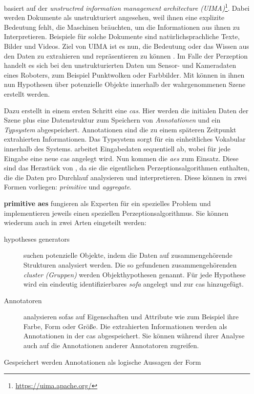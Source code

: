 \robosherlock basiert auf der \textit{unstructred information management architecture (UIMA)}\footnote{\url{https://uima.apache.org/}}. Dabei werden Dokumente als unstrukturiert angesehen, weil ihnen eine explizite Bedeutung fehlt, die Maschinen bräuchten, um die Informationen aus ihnen zu Interpretieren. Beispiele für solche Dokumente sind natürlichsprachliche Texte, Bilder und Videos. Ziel von UIMA ist es nun, die Bedeutung oder das Wissen aus den Daten zu extrahieren und repräsentieren zu können \cite{UIMA}. Im Falle der Perzeption handelt es sich bei den unstrukturierten Daten um Sensor- und Kameradaten eines Roboters, zum Beispiel Punktwolken oder Farbbilder. Mit \robosherlock können in ihnen nun Hypothesen über potenzielle Objekte innerhalb der wahrgenommenen Szene erstellt werden. \par
Dazu erstellt \robosherlock in einem ersten Schritt eine \textit{\gls{cas}}. Hier werden die initialen Daten der Szene plus eine Datenstruktur zum Speichern von \textit{Annotationen} und ein \textit{Typsystem} abgespeichert. Annotationen sind die zu einem späteren Zeitpunkt extrahierten Informationen. Das Typsystem sorgt für ein einheitliches Vokabular innerhalb des Systems. \robosherlock arbeitet Eingabedaten sequentiell ab, wobei für jede Eingabe eine neue \gls{cas} angelegt wird. \newline
Nun kommen die \textit{\glspl{ae}} zum Einsatz. Diese sind das Herzstück von \robosherlock, da sie die eigentlichen Perzeptionsalgorithmen enthalten, die die Daten pro Durchlauf analysieren und interpretieren. Diese können in zwei Formen vorliegen: \textit{primitive} und \textit{aggregate}. \par
\textbf{primitive \glspl{ae}} fungieren als Experten für ein spezielles Problem und implementieren jeweils einen speziellen Perzeptionsalgorithmus. Sie können wiederum auch in zwei Arten eingeteilt werden:
\begin{description}
\item[hypotheses generators] suchen potenzielle Objekte, indem die Daten auf zusammengehörende Strukturen analysiert werden. Die so gefundenen zusammengehörenden \textit{cluster (Gruppen)} werden Objekthypothesen genannt. Für jede Hypothese wird ein eindeutig identifizierbares \textit{\gls{sofa}} angelegt und zur \gls{cas} hinzugefügt.
\item[Annotatoren] analysieren \glspl{sofa} auf Eigenschaften und Attribute wie zum Beispiel ihre Farbe, Form oder Größe. Die extrahierten Informationen werden als Annotationen in der \gls{cas} abgespeichert. Sie können während ihrer Analyse auch auf die Annotationen anderer Annotatoren zugreifen.\end{description} Gespeichert werden Annotationen als logische Aussagen der Form 
